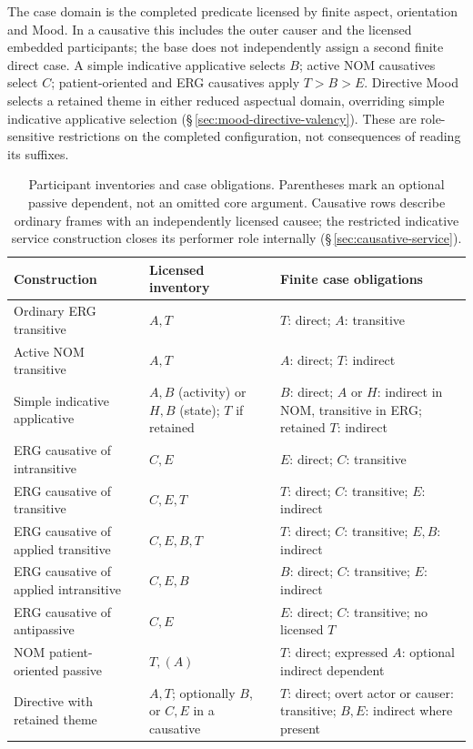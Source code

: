 The case domain is the completed predicate licensed by finite aspect,
orientation and Mood. In a causative this includes the outer causer and the
licensed embedded participants; the base does not independently assign a
second finite direct case. A simple indicative applicative selects $B$;
active NOM causatives select $C$; patient-oriented and ERG causatives apply
$T>B>E$. Directive Mood selects a retained theme in either reduced aspectual
domain, overriding simple indicative applicative selection
(§\,\ref{sec:mood-directive-valency}). These are role-sensitive restrictions
on the completed configuration, not consequences of reading its suffixes.

\begin{table}[htbp]
\footnotesize
\caption{Participant inventories and case obligations. Parentheses mark an
optional passive dependent, not an omitted core argument. Causative rows
describe ordinary frames with an independently licensed causee; the restricted
indicative service construction closes its performer role internally
(§\,\ref{sec:causative-service}).}
\label{tab:pivot-case-obligations}
\begin{tabularx}{\textwidth}{L L L}
\toprule
Construction & Licensed inventory & Finite case obligations \\
\midrule
Ordinary ERG transitive & $A,T$ & $T$: direct; $A$: transitive \\
Active NOM transitive & $A,T$ & $A$: direct; $T$: indirect \\
Simple indicative applicative & $A,B$ (activity) or $H,B$ (state); $T$ if retained & $B$: direct; $A$ or $H$: indirect in NOM, transitive in ERG; retained $T$: indirect \\
ERG causative of intransitive & $C,E$ & $E$: direct; $C$: transitive \\
ERG causative of transitive & $C,E,T$ & $T$: direct; $C$: transitive; $E$: indirect \\
ERG causative of applied transitive & $C,E,B,T$ & $T$: direct; $C$: transitive; $E,B$: indirect \\
ERG causative of applied intransitive & $C,E,B$ & $B$: direct; $C$: transitive; $E$: indirect \\
ERG causative of antipassive & $C,E$ & $E$: direct; $C$: transitive; no licensed $T$ \\
NOM patient-oriented passive & $T,(A)$ & $T$: direct; expressed $A$: optional indirect dependent \\
Directive with retained theme & $A,T$; optionally $B$, or $C,E$ in a causative & $T$: direct; overt actor or causer: transitive; $B,E$: indirect where present \\
\bottomrule
\end{tabularx}
\end{table}

